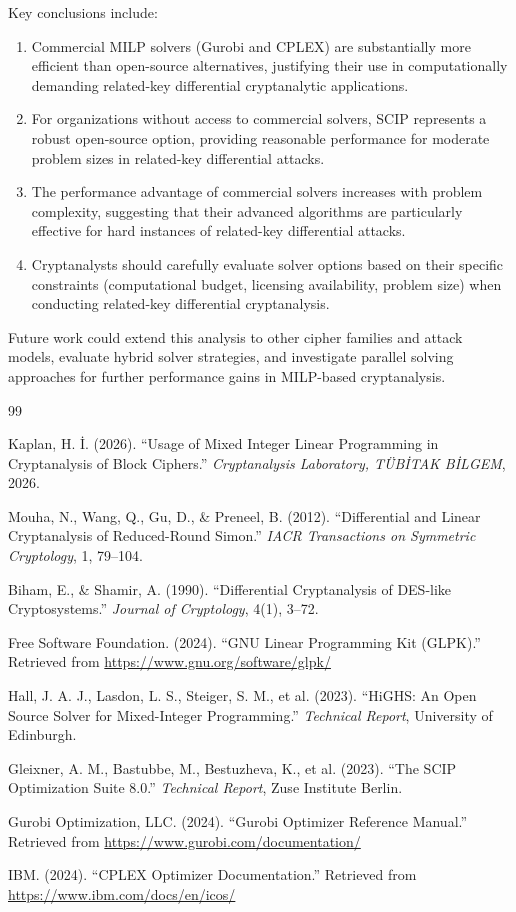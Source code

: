 \documentclass[11pt,a4paper]{article}
\begin{document}
Key conclusions include:
\begin{enumerate}
    \item Commercial MILP solvers (Gurobi and CPLEX) are substantially more efficient than open-source alternatives, justifying their use in computationally demanding related-key differential cryptanalytic applications.
    \item For organizations without access to commercial solvers, SCIP represents a robust open-source option, providing reasonable performance for moderate problem sizes in related-key differential attacks.
    \item The performance advantage of commercial solvers increases with problem complexity, suggesting that their advanced algorithms are particularly effective for hard instances of related-key differential attacks.
    \item Cryptanalysts should carefully evaluate solver options based on their specific constraints (computational budget, licensing availability, problem size) when conducting related-key differential cryptanalysis.
\end{enumerate}

Future work could extend this analysis to other cipher families and attack models, evaluate hybrid solver strategies, and investigate parallel solving approaches for further performance gains in MILP-based cryptanalysis.

\begin{thebibliography}{99}

Kaplan, H. İ. (2026).
``Usage of Mixed Integer Linear Programming in Cryptanalysis of Block Ciphers.''
\textit{Cryptanalysis Laboratory, TÜBİTAK BİLGEM}, 2026.


Mouha, N., Wang, Q., Gu, D., \& Preneel, B. (2012).
``Differential and Linear Cryptanalysis of Reduced-Round Simon.''
\textit{IACR Transactions on Symmetric Cryptology}, 1, 79--104.

Biham, E., \& Shamir, A. (1990).
``Differential Cryptanalysis of DES-like Cryptosystems.''
\textit{Journal of Cryptology}, 4(1), 3--72.

Free Software Foundation. (2024).
``GNU Linear Programming Kit (GLPK).''
Retrieved from \url{https://www.gnu.org/software/glpk/}

Hall, J. A. J., Lasdon, L. S., Steiger, S. M., et al. (2023).
``HiGHS: An Open Source Solver for Mixed-Integer Programming.''
\textit{Technical Report}, University of Edinburgh.

Gleixner, A. M., Bastubbe, M., Bestuzheva, K., et al. (2023).
``The SCIP Optimization Suite 8.0.''
\textit{Technical Report}, Zuse Institute Berlin.

Gurobi Optimization, LLC. (2024).
``Gurobi Optimizer Reference Manual.''
Retrieved from \url{https://www.gurobi.com/documentation/}

IBM. (2024).
``CPLEX Optimizer Documentation.''
Retrieved from \url{https://www.ibm.com/docs/en/icos/}

\end{thebibliography}
\end{document}
